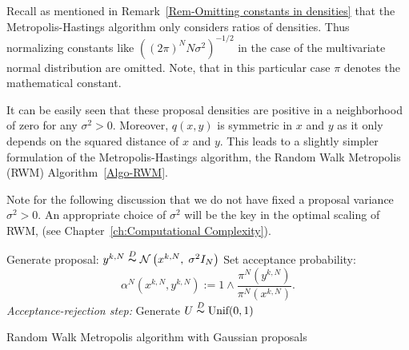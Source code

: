 Recall as mentioned in Remark~\ref{Rem-Omitting constants in densities} that the Metropolis-Hastings algorithm only considers ratios of densities. Thus normalizing constants like $ \left( (2 \pi)^{N} N \sigma^2 \right)^{-1/2} $ in the case of the multivariate normal distribution are omitted. Note, that in this particular case $\pi$ denotes the mathematical constant.

It can be easily seen that these proposal densities are positive in a neighborhood of zero for any $ \sigma^2 > 0 $. Moreover, $ q(x,y) $ is symmetric in $x$ and $y$ as it only depends on the squared distance of $x$ and $y$. This leads to a slightly simpler formulation of the Metropolis-Hastings algorithm, the Random Walk Metropolis (RWM) Algorithm~\ref{Algo-RWM}.

Note for the following discussion that we do not have fixed a proposal variance $ \sigma^2 > 0 $. An appropriate choice of $ \sigma^2 $ will be the key in the optimal scaling of RWM, (see Chapter~\ref{ch:Computational Complexity}).


\IncMargin{1em}
\begin{algorithm}[htb]
\DontPrintSemicolon


\BlankLine

{
  Generate proposal: $ y^{k,N} \stackrel{D}{\thicksim} \mathcal{N}\left(x^{k,N}, \; \sigma^2 I_N\right) $\;
  Set acceptance probability:
  \begin{equation*}
   \alpha^{N} ( x^{k,N}, y^{k,N} ) := 1 \wedge \dfrac{\pi^{N}(y^{k,N}) }{\pi^{N}(x^{k,N})}.    
  \end{equation*}\label{RWMAlgo-AcceptanceProba}
  \emph{Acceptance-rejection step:}\;
  Generate $ U \stackrel{D}{\thicksim} \text{Unif}(0,1) $\;

}
\caption{Random Walk Metropolis algorithm with Gaussian proposals}\label{Algo-RWM}
\end{algorithm}\DecMargin{1em}


